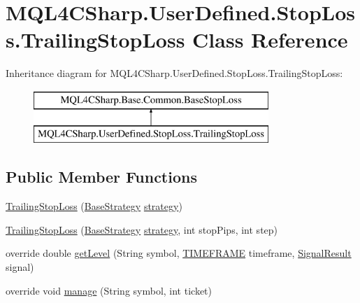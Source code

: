 \hypertarget{class_m_q_l4_c_sharp_1_1_user_defined_1_1_stop_loss_1_1_trailing_stop_loss}{}\section{M\+Q\+L4\+C\+Sharp.\+User\+Defined.\+Stop\+Loss.\+Trailing\+Stop\+Loss Class Reference}
\label{class_m_q_l4_c_sharp_1_1_user_defined_1_1_stop_loss_1_1_trailing_stop_loss}
Inheritance diagram for M\+Q\+L4\+C\+Sharp.\+User\+Defined.\+Stop\+Loss.\+Trailing\+Stop\+Loss\+:\begin{figure}[H]
\begin{center}
\leavevmode
\includegraphics[height=2.000000cm]{class_m_q_l4_c_sharp_1_1_user_defined_1_1_stop_loss_1_1_trailing_stop_loss}
\end{center}
\end{figure}
\subsection*{Public Member Functions}
\begin{DoxyCompactItemize}
\item 
\hyperlink{class_m_q_l4_c_sharp_1_1_user_defined_1_1_stop_loss_1_1_trailing_stop_loss_a9f022b53c55c1e084105cc948b4e949d}{Trailing\+Stop\+Loss} (\hyperlink{class_m_q_l4_c_sharp_1_1_base_1_1_base_strategy}{Base\+Strategy} \hyperlink{class_m_q_l4_c_sharp_1_1_base_1_1_common_1_1_base_stop_loss_a8cbd2ea8e6ab4e5af253a32116905162}{strategy})
\item 
\hyperlink{class_m_q_l4_c_sharp_1_1_user_defined_1_1_stop_loss_1_1_trailing_stop_loss_ab20c6ca16a393e75ef706475bfffa0c1}{Trailing\+Stop\+Loss} (\hyperlink{class_m_q_l4_c_sharp_1_1_base_1_1_base_strategy}{Base\+Strategy} \hyperlink{class_m_q_l4_c_sharp_1_1_base_1_1_common_1_1_base_stop_loss_a8cbd2ea8e6ab4e5af253a32116905162}{strategy}, int stop\+Pips, int step)
\item 
override double \hyperlink{class_m_q_l4_c_sharp_1_1_user_defined_1_1_stop_loss_1_1_trailing_stop_loss_a104cbf3f0482c6792bd2faff2b894eb0}{get\+Level} (String symbol, \hyperlink{namespace_m_q_l4_c_sharp_1_1_base_1_1_enums_a838810aaa87c63c12737408dba8c0b35}{T\+I\+M\+E\+F\+R\+A\+ME} timeframe, \hyperlink{class_m_q_l4_c_sharp_1_1_base_1_1_common_1_1_signal_result}{Signal\+Result} signal)
\item 
override void \hyperlink{class_m_q_l4_c_sharp_1_1_user_defined_1_1_stop_loss_1_1_trailing_stop_loss_af5dc3a0212a5f7792203a615a6a0df74}{manage} (String symbol, int ticket)
\end{DoxyCompactItemize}
